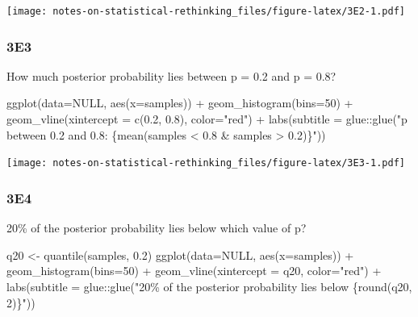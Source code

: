 \documentclass[
]{book}
\newenvironment{Shaded}{\begin{snugshade}}{\end{snugshade}}
\newcommand{\AttributeTok}[1]{\textcolor[rgb]{0.77,0.63,0.00}{#1}}
\newcommand{\ConstantTok}[1]{\textcolor[rgb]{0.00,0.00,0.00}{#1}}
\newcommand{\DecValTok}[1]{\textcolor[rgb]{0.00,0.00,0.81}{#1}}
\newcommand{\FloatTok}[1]{\textcolor[rgb]{0.00,0.00,0.81}{#1}}
\newcommand{\FunctionTok}[1]{\textcolor[rgb]{0.00,0.00,0.00}{#1}}
\newcommand{\NormalTok}[1]{#1}
\newcommand{\OtherTok}[1]{\textcolor[rgb]{0.56,0.35,0.01}{#1}}
\newcommand{\SpecialCharTok}[1]{\textcolor[rgb]{0.00,0.00,0.00}{#1}}
\newcommand{\StringTok}[1]{\textcolor[rgb]{0.31,0.60,0.02}{#1}}
\begin{document}
\texttt{[image: notes-on-statistical-rethinking\_files/figure-latex/3E2-1.pdf]}

\hypertarget{e3-1}{%
\subsubsection*{3E3}\label{e3-1}}

How much posterior probability lies between p = 0.2 and p = 0.8?

\begin{Shaded}
\begin{Highlighting}[]
\FunctionTok{ggplot}\NormalTok{(}\AttributeTok{data=}\ConstantTok{NULL}\NormalTok{, }\FunctionTok{aes}\NormalTok{(}\AttributeTok{x=}\NormalTok{samples)) }\SpecialCharTok{+} 
  \FunctionTok{geom\_histogram}\NormalTok{(}\AttributeTok{bins=}\DecValTok{50}\NormalTok{) }\SpecialCharTok{+} 
  \FunctionTok{geom\_vline}\NormalTok{(}\AttributeTok{xintercept =} \FunctionTok{c}\NormalTok{(}\FloatTok{0.2}\NormalTok{, }\FloatTok{0.8}\NormalTok{), }\AttributeTok{color=}\StringTok{"red"}\NormalTok{) }\SpecialCharTok{+} 
  \FunctionTok{labs}\NormalTok{(}\AttributeTok{subtitle =}\NormalTok{ glue}\SpecialCharTok{::}\FunctionTok{glue}\NormalTok{(}\StringTok{"p between 0.2 and 0.8: \{mean(samples \textless{} 0.8 \& samples \textgreater{} 0.2)\}"}\NormalTok{))}
\end{Highlighting}
\end{Shaded}

\texttt{[image: notes-on-statistical-rethinking\_files/figure-latex/3E3-1.pdf]}

\hypertarget{e4-1}{%
\subsubsection*{3E4}\label{e4-1}}

20\% of the posterior probability lies below which value of p?

\begin{Shaded}
\begin{Highlighting}[]
\NormalTok{q20 }\OtherTok{\textless{}{-}} \FunctionTok{quantile}\NormalTok{(samples, }\FloatTok{0.2}\NormalTok{)}
\FunctionTok{ggplot}\NormalTok{(}\AttributeTok{data=}\ConstantTok{NULL}\NormalTok{, }\FunctionTok{aes}\NormalTok{(}\AttributeTok{x=}\NormalTok{samples)) }\SpecialCharTok{+} 
  \FunctionTok{geom\_histogram}\NormalTok{(}\AttributeTok{bins=}\DecValTok{50}\NormalTok{) }\SpecialCharTok{+} 
  \FunctionTok{geom\_vline}\NormalTok{(}\AttributeTok{xintercept =}\NormalTok{ q20, }\AttributeTok{color=}\StringTok{"red"}\NormalTok{) }\SpecialCharTok{+} 
  \FunctionTok{labs}\NormalTok{(}\AttributeTok{subtitle =}\NormalTok{ glue}\SpecialCharTok{::}\FunctionTok{glue}\NormalTok{(}\StringTok{"20\% of the posterior probability lies below \{round(q20, 2)\}"}\NormalTok{))}
\end{Highlighting}
\end{Shaded}
\end{document}
